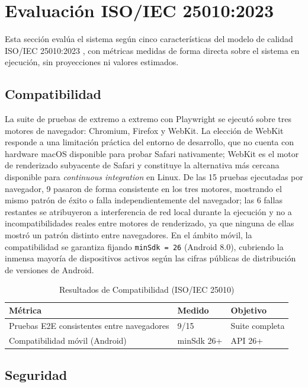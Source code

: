 \section{Evaluación ISO/IEC 25010:2023}
\label{sec:iso25010}

Esta sección evalúa el sistema según cinco características del modelo
de calidad ISO/IEC 25010:2023 \cite{iso25010:2023}, con métricas medidas de forma directa
sobre el sistema en ejecución, sin proyecciones ni valores estimados.

\subsection{Compatibilidad}

La suite de pruebas de extremo a extremo con Playwright se ejecutó
sobre tres motores de navegador: Chromium, Firefox y WebKit. La
elección de WebKit responde a una limitación práctica del entorno de
desarrollo, que no cuenta con hardware macOS disponible para probar
Safari nativamente; WebKit es el motor de renderizado subyacente de
Safari y constituye la alternativa más cercana disponible para
\emph{continuous integration} en Linux. De las 15 pruebas ejecutadas
por navegador, 9 pasaron de forma consistente en los tres motores,
mostrando el mismo patrón de éxito o falla independientemente del
navegador; las 6 fallas restantes se atribuyeron a interferencia de
red local durante la ejecución y no a incompatibilidades reales entre
motores de renderizado, ya que ninguna de ellas mostró un patrón
distinto entre navegadores. En el ámbito móvil, la compatibilidad se
garantiza fijando \texttt{minSdk = 26} (Android 8.0), cubriendo la
inmensa mayoría de dispositivos activos según las cifras públicas de
distribución de versiones de Android.

\begin{table}[htbp]
\centering
\caption{Resultados de Compatibilidad (ISO/IEC 25010)}
\label{tab:iso-compatibilidad}
\begin{tabular}{lll}
\toprule
Métrica & Medido & Objetivo \\
\midrule
Pruebas E2E consistentes entre navegadores & 9/15 & Suite completa \\
Compatibilidad móvil (Android) & minSdk 26+ & API 26+ \\
\bottomrule
\end{tabular}
\end{table}

\subsection{Seguridad}

